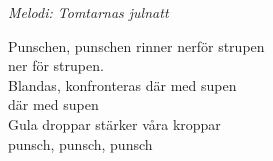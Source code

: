 {\footnotesize\textit{Melodi: Tomtarnas julnatt}}\par
\vspace{10pt}
Punschen, punschen rinner nerför strupen\\
ner för strupen.\\
Blandas, konfronteras där med supen\\
där med supen\\
Gula droppar stärker våra kroppar\\
punsch, punsch, punsch
